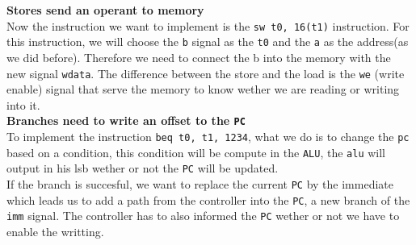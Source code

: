 \textbf{Stores send an operant to memory}\\
	Now the instruction we want to implement is the \texttt{sw t0, 16(t1)} instruction. For this instruction, we will choose the \texttt{b} signal as the \texttt{t0} and the \texttt{a} as the address(as we did before). Therefore we need to connect the b into the memory with the new signal \texttt{wdata}. The difference between the store and the load is the \texttt{we} (write enable) signal that serve the memory to know wether we are reading or writing into it.\\

\textbf{Branches need to write an offset to the \texttt{PC}}\\
	 To implement the instruction \texttt{beq t0, t1, 1234}, what we do is to change the \texttt{pc} based on a condition, this condition will be compute in the \texttt{ALU}, the \texttt{alu} will output in his lsb wether or not the \texttt{PC} will be updated.\\
	  If the branch is succesful, we want to replace the current \texttt{PC} by the immediate which leads us to add a path from the controller into the \texttt{PC}, a new branch of the \texttt{imm} signal. The controller has to also informed the \texttt{PC} wether or not we have to enable the writting.\\

